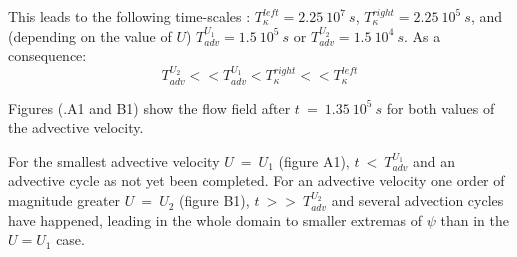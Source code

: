 This leads to the following time-scales : $T_{\kappa}^{left}=2.25 \ 10^7 \ s$, $T_{\kappa}^{right}=2.25 \ 10^5 \ s$, and (depending on the value of $U$) $T_{adv}^{U_1}=1.5 \ 10^5 \ s$ or $T_{adv}^{U_2}=1.5 \ 10^4 \ s$. As a consequence:
\begin{equation}
\displaystyle
T_{adv}^{U_2}<<T_{adv}^{U_1}<T_{\kappa}^{right}<<T_{\kappa}^{left}
\end{equation}

Figures (.A1 and B1) show the flow field after $t\ =\ 1.35\ 10^5 \ s$ for both values of the advective velocity. 

For the smallest advective velocity $U\ =\ U_1$ (figure A1), $t\ <\ T_{adv}^{U_1}$ and an advective cycle as not yet been completed.
For an advective velocity one order of magnitude greater $U\ =\ U_2$ (figure B1), $t\ >>\ T_{adv}^{U_2}$ and several advection cycles have happened, leading in the whole domain to smaller extremas of $\psi$ than in the $U=U_1$ case.

